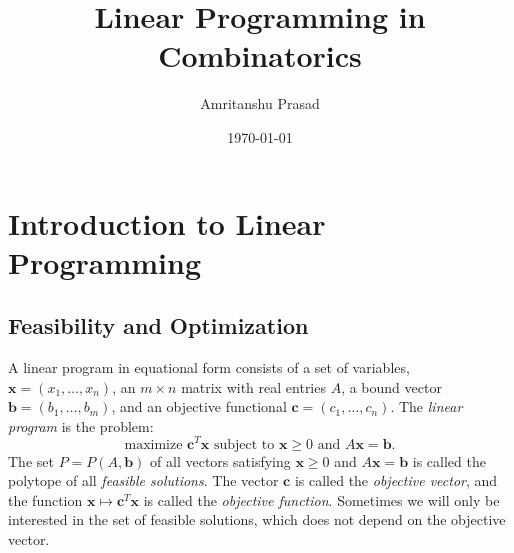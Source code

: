 \documentclass{amsbook}
\newcommand{\xx}{\mathbf x}
\newcommand{\cc}{\mathbf c}
\newcommand{\bb}{\mathbf b}
\theoremstyle{definition}
\theoremstyle{remark}
\begin{document}
\title{Linear Programming in Combinatorics}
\author{Amritanshu Prasad}
\address{The Institute of Mathematical Sciences, Chennai.}
\address{Homi Bhabha National Institute, Mumbai.}
\date{\today}
\maketitle
\chapter{Introduction to Linear Programming}
\label{cha:intro-lp}
\section{Feasibility and Optimization}
\label{sec:feas-opt}
A linear program in equational form consists of a set of variables, $\xx=(x_1,\dotsc,x_n)$, an $m\times n$ matrix with real entries $A$, a bound vector $\bb=(b_1,\dotsc,b_m)$, and an objective functional $\cc = (c_1,\dotsc,c_n)$.
The \emph{linear program} is the problem:
\begin{equation}
  \label{eq:lp-problem}
  \text{maximize $\cc^T\xx$ subject to $\xx\geq 0$ and $A\xx=\bb$}.
\end{equation}
The set $P=P(A,\bb)$ of all vectors satisfying $\xx\geq 0$ and $A\xx=\bb$ is called the polytope of all \emph{feasible solutions}.
The vector $\cc$ is called the \emph{objective vector}, and the function $\xx\mapsto \cc^T\xx$ is called the \emph{objective function}.
Sometimes we will only be interested in the set of feasible solutions, which does not depend on the objective vector.
\end{document}
